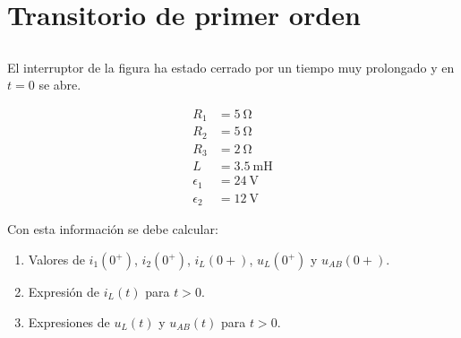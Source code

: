 \documentclass[12pt]{article}
\begin{document}
\title{}

\section{Transitorio de primer orden}

\subsection{}

El interruptor de la figura ha estado cerrado por un tiempo muy prolongado y en $t = 0$ se abre.

\begin{minipage}{0.5\linewidth}
\end{minipage}
\begin{minipage}{0.5\linewidth}
  \begin{align*}
    R_1 &= \SI{5}{\ohm}\\
    R_2 &= \SI{5}{\ohm}\\
    R_3 &= \SI{2}{\ohm}\\
    L &= \SI{3.5}{\milli\henry}\\
    \epsilon_1 &= \SI{24}{\volt}\\
    \epsilon_2 &= \SI{12}{\volt}
  \end{align*}
\end{minipage}

\medskip

Con esta información se debe calcular:
\begin{enumerate}
\item Valores de $i_1(0^+)$, $i_2(0^+)$, $i_L(0+)$, $u_L(0^+)$ y $u_{AB}(0+)$.
\item Expresión de $i_L(t)$ para $t > 0$.
\item Expresiones de $u_L(t)$ y $u_{AB}(t)$ para $t > 0$.
\end{enumerate}
\end{document}
